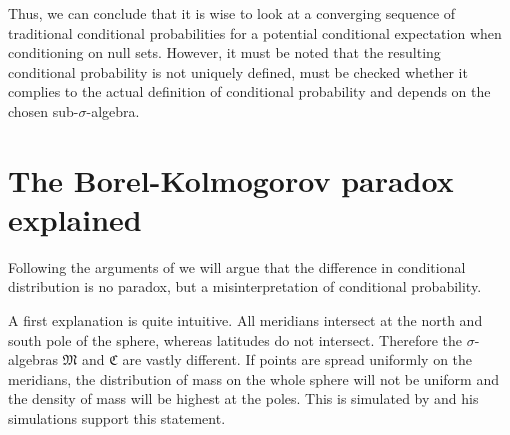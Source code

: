 \documentclass[a4paper]{report}
\theoremstyle{plain}
\theoremstyle{definition}
\theoremstyle{remark}
\numberwithin{equation}{chapter}
\DeclareMathOperator{\1}{\mathbbm{1}}
\begin{document}
Thus, we can conclude that it is wise to look at a converging sequence of traditional conditional probabilities for a potential conditional expectation when conditioning on null sets. However, it must be noted that the resulting conditional probability is not uniquely defined, must be checked whether it complies to the actual definition of conditional probability and depends on the chosen sub-$\sigma$-algebra.

\section{The Borel-Kolmogorov paradox explained}\label{sec:BorelExplained}
Following the arguments of \cite{Gyenis17} we will argue that the difference in conditional distribution is no paradox, but a misinterpretation of conditional probability.

A first explanation is quite intuitive. All meridians intersect at the north and south pole of the sphere, whereas latitudes do not intersect. Therefore the $\sigma$-algebras $\mathfrak{M}$ and $\mathfrak{C}$ are vastly different. If points are spread uniformly on the meridians, the distribution of mass on the whole sphere will not be uniform and the density of mass will be highest at the poles. This is simulated by \cite{Weisstein} and his simulations support this statement.
\end{document}
